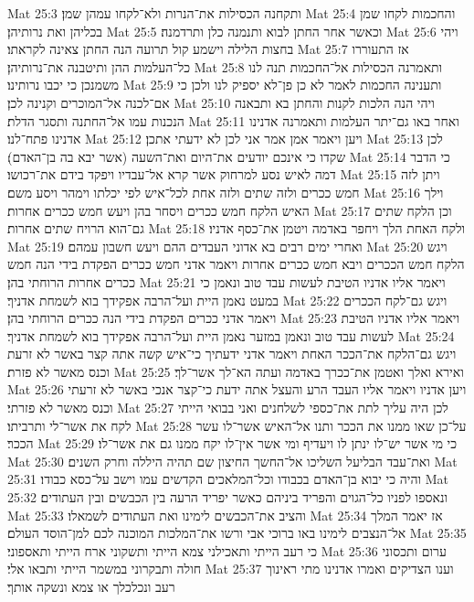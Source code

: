 Mat 25:3  ותקחנה הכסילות את־הנרות ולא־לקחו עמהן שמן׃
Mat 25:4  והחכמות לקחו שמן בכליהן ואת נרותיהן׃
Mat 25:5  וכאשר אחר החתן לבוא ותנמנה כלן ותרדמנה׃
Mat 25:6  ויהי בחצות הלילה וישמע קול תרועה הנה החתן צאינה לקראתו׃
Mat 25:7  אז התעוררו כל־העלמות ההן ותיטבנה את־נרותיהן׃
Mat 25:8  ותאמרנה הכסילות אל־החכמות תנה לנו משמנכן כי יכבו נרותינו׃
Mat 25:9  ותענינה החכמות לאמר לא כן פן־לא יספיק לנו ולכן כי אם־לכנה אל־המוכרים וקנינה לכן׃
Mat 25:10  ויהי הנה הלכות לקנות והחתן בא ותבאנה הנכנות עמו אל־החתנה ותסגר הדלת׃
Mat 25:11  ואחר באו גם־יתר העלמות ותאמרנה אדנינו אדנינו פתח־לנו׃
Mat 25:12  ויען ויאמר אמן אמר אני לכן לא ידעתי אתכן׃
Mat 25:13  לכן שקדו כי אינכם יודעים את־היום ואת־השעה (אשר יבא בה בן־האדם)׃
Mat 25:14  כי הדבר דמה לאיש נסע למרחוק אשר קרא אל־עבדיו ויפקד בידם את־רכושו׃
Mat 25:15  ויתן לזה חמש ככרים ולזה שתים ולזה אחת לכל־איש לפי יכלתו וימהר ויסע משם׃
Mat 25:16  וילך האיש הלקח חמש ככרים ויסחר בהן ויעש חמש ככרים אחרות׃
Mat 25:17  וכן הלקח שתים גם־הוא הרויח שתים אחרות׃
Mat 25:18  ולקח האחת הלך ויחפר באדמה ויטמן את־כסף אדניו׃
Mat 25:19  ואחרי ימים רבים בא אדוני העבדים ההם ויעש חשבון עמהם׃
Mat 25:20  ויגש הלקח חמש הככרים ויבא חמש ככרים אחרות ויאמר אדני חמש ככרים הפקדת בידי הנה חמש ככרים אחרות הרוחתי בהן׃
Mat 25:21  ויאמר אליו אדניו הטיבת לעשות עבד טוב ונאמן כי במעט נאמן היית ועל־הרבה אפקידך בוא לשמחת אדניך׃
Mat 25:22  ויגש גם־לקח הככרים ויאמר אדני ככרים הפקדת בידי הנה ככרים הרוחתי בהן׃
Mat 25:23  ויאמר אליו אדניו הטיבת לעשות עבד טוב ונאמן במזער נאמן היית ועל־הרבה אפקידך בוא לשמחת אדניך׃
Mat 25:24  ויגש גם־הלקח את־הככר האחת ויאמר אדני ידעתיך כי־איש קשה אתה קצר באשר לא זרעת וכנס מאשר לא פזרת׃
Mat 25:25  ואירא ואלך ואטמן את־ככרך באדמה ועתה הא־לך אשר־לך׃
Mat 25:26  ויען אדניו ויאמר אליו העבד הרע והעצל אתה ידעת כי־קצר אנכי באשר לא זרעתי וכנס מאשר לא פזרתי׃
Mat 25:27  לכן היה עליך לתת את־כספי לשלחנים ואני בבואי הייתי לקח את אשר־לי ותרביתו׃
Mat 25:28  על־כן שאו ממנו את הככר ותנו אל־האיש אשר־לו עשר הככר׃
Mat 25:29  כי מי אשר יש־לו ינתן לו ויעדיף ומי אשר אין־לו יקח ממנו גם את אשר־לו׃
Mat 25:30  ואת־עבד הבליעל השליכו אל־החשך החיצון שם תהיה היללה וחרק השנים׃
Mat 25:31  והיה כי יבוא בן־האדם בכבודו וכל־המלאכים הקדשים עמו וישב על־כסא כבודו׃
Mat 25:32  ונאספו לפניו כל־הגוים והפריד ביניהם כאשר יפריד הרעה בין הכבשים ובין העתודים׃
Mat 25:33  והציב את־הכבשים לימינו ואת העתודים לשמאלו׃
Mat 25:34  אז יאמר המלך אל־הנצבים לימינו באו ברוכי אבי ורשו את־המלכות המוכנה לכם למן־הוסד העולם׃
Mat 25:35  כי רעב הייתי ותאכילני צמא הייתי ותשקוני ארח הייתי ותאספוני׃
Mat 25:36  ערום ותכסוני חולה ותבקרוני במשמר הייתי ותבאו אלי׃
Mat 25:37  וענו הצדיקים ואמרו אדנינו מתי ראינוך רעב ונכלכלך או צמא ונשקה אותך׃
